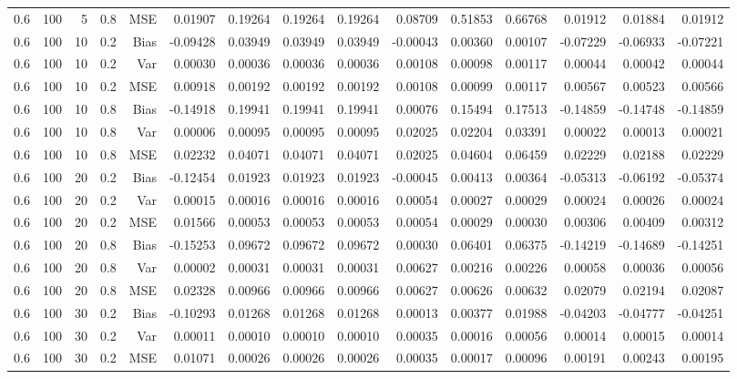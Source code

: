 \begin{table}[!htbp]
\begin{tabular}{lrrrrrrrrrrrrrr}
0.6 & 100 &  5 & 0.8 & MSE & 0.01907 & 0.19264 & 0.19264 & 0.19264 & 0.08709 & 0.51853 & 0.66768 & 0.01912 & 0.01884 & 0.01912 \\
0.6 & 100 & 10 & 0.2 & Bias & -0.09428 & 0.03949 & 0.03949 & 0.03949 & -0.00043 & 0.00360 & 0.00107 & -0.07229 & -0.06933 & -0.07221 \\
0.6 & 100 & 10 & 0.2 & Var & 0.00030 & 0.00036 & 0.00036 & 0.00036 & 0.00108 & 0.00098 & 0.00117 & 0.00044 & 0.00042 & 0.00044 \\
0.6 & 100 & 10 & 0.2 & MSE & 0.00918 & 0.00192 & 0.00192 & 0.00192 & 0.00108 & 0.00099 & 0.00117 & 0.00567 & 0.00523 & 0.00566 \\
0.6 & 100 & 10 & 0.8 & Bias & -0.14918 & 0.19941 & 0.19941 & 0.19941 & 0.00076 & 0.15494 & 0.17513 & -0.14859 & -0.14748 & -0.14859 \\
0.6 & 100 & 10 & 0.8 & Var & 0.00006 & 0.00095 & 0.00095 & 0.00095 & 0.02025 & 0.02204 & 0.03391 & 0.00022 & 0.00013 & 0.00021 \\
0.6 & 100 & 10 & 0.8 & MSE & 0.02232 & 0.04071 & 0.04071 & 0.04071 & 0.02025 & 0.04604 & 0.06459 & 0.02229 & 0.02188 & 0.02229 \\
0.6 & 100 & 20 & 0.2 & Bias & -0.12454 & 0.01923 & 0.01923 & 0.01923 & -0.00045 & 0.00413 & 0.00364 & -0.05313 & -0.06192 & -0.05374 \\
0.6 & 100 & 20 & 0.2 & Var & 0.00015 & 0.00016 & 0.00016 & 0.00016 & 0.00054 & 0.00027 & 0.00029 & 0.00024 & 0.00026 & 0.00024 \\
0.6 & 100 & 20 & 0.2 & MSE & 0.01566 & 0.00053 & 0.00053 & 0.00053 & 0.00054 & 0.00029 & 0.00030 & 0.00306 & 0.00409 & 0.00312 \\
0.6 & 100 & 20 & 0.8 & Bias & -0.15253 & 0.09672 & 0.09672 & 0.09672 & 0.00030 & 0.06401 & 0.06375 & -0.14219 & -0.14689 & -0.14251 \\
0.6 & 100 & 20 & 0.8 & Var & 0.00002 & 0.00031 & 0.00031 & 0.00031 & 0.00627 & 0.00216 & 0.00226 & 0.00058 & 0.00036 & 0.00056 \\
0.6 & 100 & 20 & 0.8 & MSE & 0.02328 & 0.00966 & 0.00966 & 0.00966 & 0.00627 & 0.00626 & 0.00632 & 0.02079 & 0.02194 & 0.02087 \\
0.6 & 100 & 30 & 0.2 & Bias & -0.10293 & 0.01268 & 0.01268 & 0.01268 & 0.00013 & 0.00377 & 0.01988 & -0.04203 & -0.04777 & -0.04251 \\
0.6 & 100 & 30 & 0.2 & Var & 0.00011 & 0.00010 & 0.00010 & 0.00010 & 0.00035 & 0.00016 & 0.00056 & 0.00014 & 0.00015 & 0.00014 \\
0.6 & 100 & 30 & 0.2 & MSE & 0.01071 & 0.00026 & 0.00026 & 0.00026 & 0.00035 & 0.00017 & 0.00096 & 0.00191 & 0.00243 & 0.00195 \\

\end{tabular}
\end{table}

